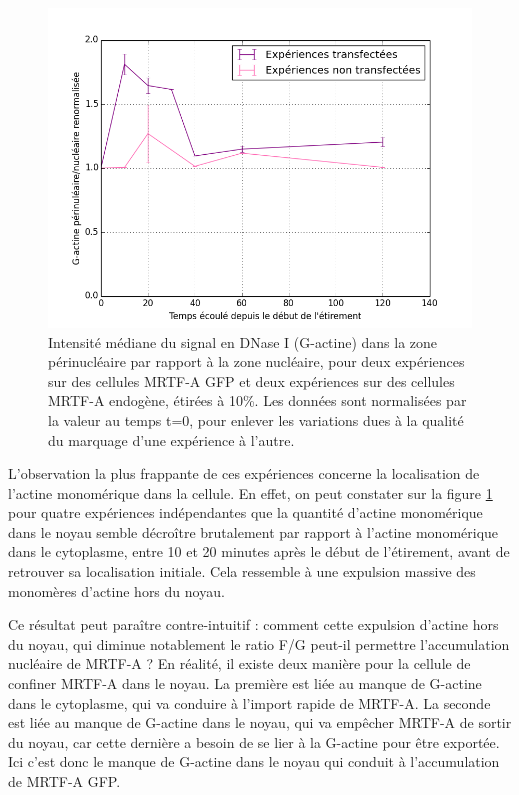 \begin{figure}
\includegraphics[scale=0.5]{Figures/Et10_G_ratio.png} 
\caption{\label{Et10_G} Intensité médiane du signal en DNase I (G-actine) dans la zone périnucléaire par rapport à la zone nucléaire, pour deux expériences sur des cellules MRTF-A GFP et deux expériences sur des cellules MRTF-A endogène, étirées à 10\%. Les données sont normalisées par la valeur au temps t=0, pour enlever les variations dues à la qualité du marquage d'une expérience à l'autre.}
\end{figure}

L'observation la plus frappante de ces expériences concerne la localisation de l'actine monomérique dans la cellule. En effet, on peut constater sur la figure \ref{Et10_G} pour quatre expériences indépendantes que la quantité d'actine monomérique dans le noyau semble décroître brutalement par rapport à l'actine monomérique dans le cytoplasme, entre 10 et 20 minutes après le début de l'étirement, avant de retrouver sa localisation initiale. Cela ressemble à une expulsion massive des monomères d'actine hors du noyau. 

Ce résultat peut paraître contre-intuitif : comment cette expulsion d'actine hors du noyau, qui diminue notablement le ratio F/G peut-il permettre l'accumulation nucléaire de MRTF-A ? En réalité, il existe deux manière pour la cellule de confiner MRTF-A dans le noyau. La première est liée au manque de G-actine dans le cytoplasme, qui va conduire à l'import rapide de MRTF-A. La seconde est liée au manque de G-actine dans le noyau, qui va empêcher MRTF-A de sortir du noyau, car cette dernière a besoin de se lier à la G-actine pour être exportée. Ici c'est donc le manque de G-actine dans le noyau qui conduit à l'accumulation de MRTF-A GFP. 

